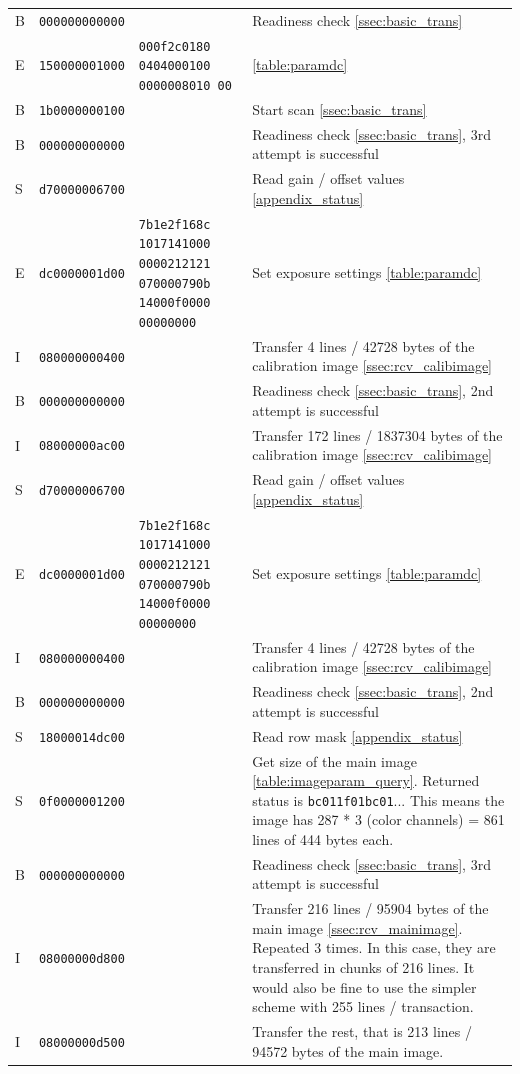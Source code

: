 \documentclass{article}
\begin{document}
\begin{longtable}{p{0.4cm} | p{2.3cm} | p{2cm} | p{5cm}}
  B & {\tt 000000000000} &  & Readiness check \autoref{ssec:basic_trans} \\
  E & {\tt 150000001000} & \tt 000f2c0180 0404000100 0000008010 00 & \autoref{table:paramdc} \\
  B & {\tt 1b0000000100} &  & Start scan \autoref{ssec:basic_trans} \\
  B & {\tt 000000000000} &  & Readiness check \autoref{ssec:basic_trans}, 3rd attempt is successful \\ 
  S & {\tt d70000006700} &  & Read gain / offset values \autoref{appendix_status} \\
  E & {\tt dc0000001d00} & \tt 7b1e2f168c 1017141000 0000212121 070000790b 14000f0000 00000000
                         & Set exposure settings \autoref{table:paramdc} \\
  I & {\tt 080000000400} &  & Transfer 4 lines / 42728 bytes of the calibration image \autoref{ssec:rcv_calibimage} \\
  B & {\tt 000000000000} &  & Readiness check \autoref{ssec:basic_trans}, 2nd attempt is successful \\
  I & {\tt 08000000ac00} &  & Transfer 172 lines / 1837304 bytes of the calibration image \autoref{ssec:rcv_calibimage}  \\
  S & {\tt d70000006700} &  & Read gain / offset values \autoref{appendix_status} \\
  E & {\tt dc0000001d00} & \tt 7b1e2f168c 1017141000 0000212121 070000790b 14000f0000 00000000
                         & Set exposure settings \autoref{table:paramdc} \\
  I & {\tt 080000000400} &  & Transfer 4 lines / 42728 bytes of the calibration image \autoref{ssec:rcv_calibimage} \\
  B & {\tt 000000000000} &  & Readiness check \autoref{ssec:basic_trans}, 2nd attempt is successful \\
  S & {\tt 18000014dc00} &  & Read row mask \autoref{appendix_status} \\
  S & {\tt 0f0000001200} &  & Get size of the main image \autoref{table:imageparam_query}.
                              Returned status is {\tt bc011f01bc01}... This means the
                              image has 287 * 3 (color channels) = 861 lines of 444 bytes each. \\
  B & {\tt 000000000000} &  & Readiness check \autoref{ssec:basic_trans}, 3rd attempt is successful \\
  I & {\tt 08000000d800} &  & Transfer 216 lines / 95904 bytes of the main image \autoref{ssec:rcv_mainimage}.
                              Repeated 3 times.
                              In this case, they are transferred in chunks of 216 lines. It would also
                              be fine to use the simpler scheme with 255 lines / transaction. \\
  I & {\tt 08000000d500} &  & Transfer the rest, that is 213 lines / 94572 bytes of the main image. \\
\end{longtable}
\end{document}
